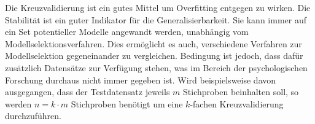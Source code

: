 Die Kreuzvalidierung ist ein gutes Mittel um Overfitting entgegen zu wirken.
Die Stabilität ist ein guter Indikator für die Generalisierbarkeit. Sie kann immer auf ein Set potentieller Modelle angewandt werden, unabhängig vom Modellselektionsverfahren. Dies ermöglicht es auch, verschiedene Verfahren zur Modellselektion gegeneinander zu vergleichen.
Bedingung ist jedoch, dass dafür zusätzlich Datensätze zur Verfügung stehen, was im Bereich der psychologischen Forschung durchaus nicht immer gegeben ist.
Wird beispielsweise davon ausgegangen, dass der Testdatensatz jeweils $m$ Stichproben beinhalten soll, so werden $n = k \cdot m$ Stichproben benötigt um eine $k$-fachen Kreuzvalidierung durchzuführen. 